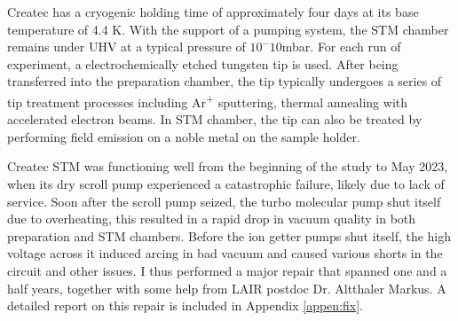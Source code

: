Createc has a cryogenic holding time of approximately four days at its base temperature of 4.4 K. With the support of a pumping system, the STM chamber remains under UHV at a typical pressure of $10^-10$mbar. For each run of experiment, a electrochemically etched tungsten tip is used. After being transferred into the preparation chamber, the tip typically undergoes a series of tip treatment processes including Ar\textsuperscript{+} sputtering, thermal annealing with accelerated electron beams. In STM chamber, the tip can also be treated by performing field emission on a noble metal on the sample holder. 

Createc \ac{STM} was functioning well from the beginning of the study to May 2023, when its dry scroll pump experienced a catastrophic failure, likely due to lack of service. Soon after the scroll pump seized, the turbo molecular pump shut itself due to overheating, this resulted in a rapid drop in vacuum quality in both preparation and STM chambers. Before the ion getter pumps shut itself, the high voltage across it induced arcing in bad vacuum and caused various shorts in the circuit and other issues. I thus performed a major repair that spanned one and a half years, together with some help from LAIR postdoc Dr. Altthaler Markus. A detailed report on this repair is included in Appendix \ref{appen:fix}. 
